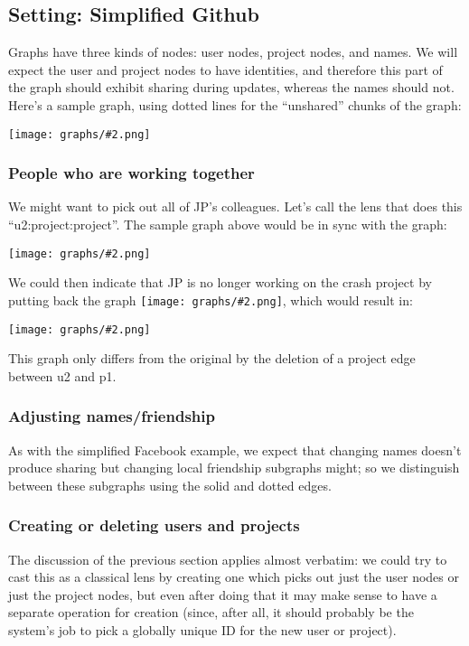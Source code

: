 \documentclass{article}
\newcommand{\scaledgraph}[2]{\texttt{[image: graphs/\#2.png]}}
\newcommand{\graph}[1]{\scaledgraph{0.5}{#1}}
\newcommand{\centeredgraph}[1]{\begin{center}\graph{#1}\end{center}}
\newcommand{\inlinegraph}[1]{\scaledgraph{0.2}{#1}}
\begin{document}
\subsection*{Setting: Simplified Github}

Graphs have three kinds of nodes: user nodes, project nodes, and names. We
will expect the user and project nodes to have identities, and therefore
this part of the graph should exhibit sharing during updates, whereas the
names should not. Here's a sample graph, using dotted lines for the
``unshared'' chunks of the graph:

\centeredgraph{github-start}

\subsubsection*{People who are working together}

We might want to pick out all of JP's colleagues. Let's call the lens that
does this ``u2:project:project''. The sample graph above would be in sync
with the graph:
\centeredgraph{github-colleagues}
We could then indicate that JP is no longer working on the crash project by
putting back the graph \inlinegraph{github-fewer-projects}, which would
result in:
\centeredgraph{github-start-fewer-projects}
This graph only differs from the original by the deletion of a project edge
between u2 and p1.

\subsubsection*{Adjusting names/friendship}

As with the simplified Facebook example, we expect that changing names
doesn't produce sharing but changing local friendship subgraphs might; so we
distinguish between these subgraphs using the solid and dotted edges.

\subsubsection*{Creating or deleting users and projects}

The discussion of the previous section applies almost verbatim: we could try
to cast this as a classical lens by creating one which picks out just the
user nodes or just the project nodes, but even after doing that it may make
sense to have a separate operation for creation (since, after all, it should
probably be the system's job to pick a globally unique ID for the new user
or project).
\end{document}

